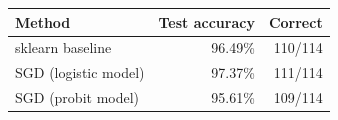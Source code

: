 \begin{tabular}{lrr}
\toprule
Method & Test accuracy & Correct \\
\midrule
sklearn baseline & 96.49\% & 110/114 \\
SGD (logistic model) & 97.37\% & 111/114 \\
SGD (probit model) & 95.61\% & 109/114 \\
\bottomrule
\end{tabular}
